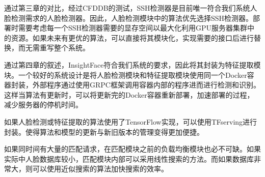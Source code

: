 通过第三章的对比，经过CFDDB的测试，SSH检测器\cite{najibi2017ssh}是目前唯一符合我们系统人脸检测需求的人脸检测器。因此，人脸检测模块中的算法优先选择SSH检测器。部署时需要考虑每一个SSH检测器需要的显存空间以最大化利用GPU服务器集群中的资源。如果未来有更优的算法，可以直接将其模块化，实现需要的接口后进行替换，而无需重写整个系统。

通过第四章的叙述，InsightFace\cite{deng2018arcface}符合我们系统的要求，因此将其封装为特征提取模块。一个较好的系统设计是将人脸检测模块和特征提取模块使用同一个Docker容器封装，外部程序通过使用GRPC框架调用容器内部的程序进而进行检测和识别。这样当算法有更新时，可以将更新完的Docker容器重新部署，加速部署的过程，减少服务器的停机时间。

如果人脸检测或特征提取的算法使用了TensorFlow实现，可以使用TFserving进行封装。使得算法和模型的更新与新旧版本的管理变得更加便捷。

如果同时间有大量的匹配请求，在匹配模块之前的负载均衡模块也必不可缺。如果实际中人脸数据库较小，匹配模块内部可以采用线性搜索的方法。而如果数据库非常大，则可以使用近似搜索的算法加快搜索的效率。



